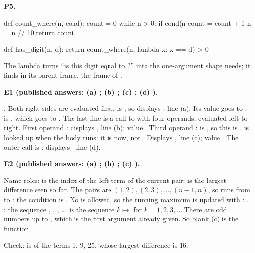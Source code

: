 \documentclass[10pt]{scrartcl}
\begin{document}
\begin{prob}\textbf{P5.}
\begin{py}
def count_where(n, cond):
    count = 0
    while n > 0:
        if cond(n %
            count = count + 1
        n = n // 10
    return count

def has_digit(n, d):
    return count_where(n, lambda x: x == d) > 0
\end{py}
The lambda turns ``is this digit equal to ?'' into the one-argument shape  needs; it finds  in its parent frame, the frame of .
\end{prob}

\begin{prob}\textbf{E1 (published answers: (a) ; (b) ; (c) ; (d) ).}
\begin{steps}
  \ii {}. Both right sides are evaluated first.  is , so  displays : line (a). Its value  goes to .  is , which goes to .
  \ii The last line is a call to  with four operands, evaluated left to right.
  \ii First operand : displays , line (b); value .
  \ii Third operand :  is , so this is .  is looked up when the body runs: it is  now, not . Displays , line (c); value .
  \ii The outer call is : displays , line (d).
\end{steps}
\end{prob}

\begin{prob}\textbf{E2 (published answers: (a) ; (b) ; (c) ).}
\begin{steps}
  \ii Name roles:  is the index of the left term of the current pair;  is the largest difference seen so far.
  \ii The pairs are $(1,2),(2,3),\dots,(n-1,n)$, so  runs from  to : the condition is .
  \ii No  is allowed, so the running maximum is updated with : .
  \ii {}: the sequence , , , \dots\ is the sequence $k\mapsto$  for $k=1,2,3,\dots$ There are  odd numbers up to , which is the first argument already given. So blank (c) is the function .
\end{steps}
Check:  is  of the terms 1, 9, 25, whose largest difference is 16.
\end{prob}
\end{document}
